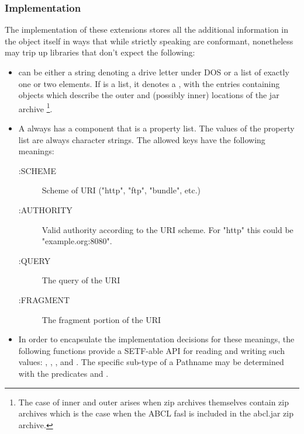 \documentclass[10pt]{book}
\begin{document}
\subsubsection{Implementation}

The implementation of these extensions stores all the additional
information in the  object itself in ways that while strictly
speaking are conformant, nonetheless may trip up libraries that don't
expect the following:

\begin{itemize}
\item {} can be either a string denoting a drive letter
  under \textsc{DOS} or a list of exactly one or two elements.  If
   is a list, it denotes a , with
  the entries containing  objects which describe the
  outer and (possibly inner) locations of the jar
  archive \footnote{The case of inner and outer
     arises when zip archives themselves
    contain zip archives which is the case when the ABCL fasl is
    included in the abcl.jar zip archive.}.

\item A  always has a  component that is a
  property list.  The values of the  property list are
  always character strings.  The allowed keys have the following meanings:
  \begin{description}
  \item[:SCHEME] Scheme of URI ("http", "ftp", "bundle", etc.)
  \item[:AUTHORITY] Valid authority according to the URI scheme.  For
    "http" this could be "example.org:8080". 
  \item[:QUERY] The query of the \textsc{URI} 
  \item[:FRAGMENT] The fragment portion of the \textsc{URI}
  \end{description}

\item In order to encapsulate the implementation decisions for these
  meanings, the following functions provide a SETF-able API for
  reading and writing such values: ,
  , , and
  .  The specific sub-type of a Pathname may
  be determined with the predicates  and
  .

\label{EXTENSIONS:URL-PATHNAME-SCHEME}

\label{EXTENSIONS:URL-PATHNAME-FRAGMENT}

\label{EXTENSIONS:URL-PATHNAME-AUTHORITY}

\label{EXTENSIONS:PATHNAME-URL-P}

\label{EXTENSIONS:URL-PATHNAME-QUERY}

\end{itemize}
\end{document}

